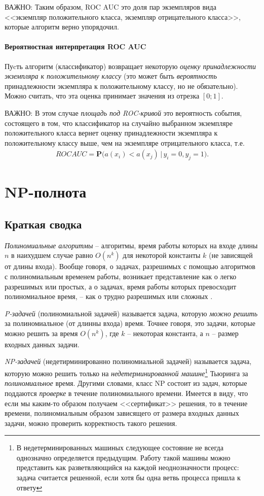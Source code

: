 \documentclass[%
	11pt,
	a4paper,
	utf8,
		]{article}
\begin{document}
ВАЖНО: Таким образом, ROC AUC это доля пар экземпляров вида <<экземпляр положительного класса, экземпляр отрицательного класса>>, которые алгоритм верно упорядочил.

\paragraph{Вероятностная интерпретация ROC AUC} Пуcть алгоритм (классификатор) возвращает некоторую \emph{оценку принадлежности экземпляра к положительному классу} (это может быть \emph{вероятность} принадлежности экземпляра к положительному классу, но не обязательно). Можно считать, что эта оценка принимает значения из отрезка $ [0;1] $.

ВАЖНО: В этом случае \emph{площадь под ROC-кривой} это вероятность события, состоящего в том, что классификатор на случайно выбранном экземпляре положительного класса вернет оценку принадлежности экземпляра к положительному классу выше, чем на экземпляре отрицательного класса, т.е.
\begin{align*}
	ROC AUC = \mathbf{P} \Big( a(x_i) < a(x_j) \, | \, y_i = 0, y_j = 1\Big).
\end{align*}


\section{NP-полнота}

\subsection{Краткая сводка}

\emph{Полиномиальные алгоритмы} -- алгоритмы, время работы которых на входе длины $ n $ в наихудшем случае равно $ O(n^k) $ для некоторой константы $ k $ (не зависящей от длины входа). Вообще говоря, о задачах, разрешимых с помощью алгоритмов с полиномиальным временем работы, возникает представление как о легко разрешимых или простых, а о задачах, время работы которых превосходит полиномиальное время, -- как о трудно разрешимых или сложных \cite[1096]{cormen-algo:2013}.

\emph{P-задачей} (полиномиальной задачей) называется задача, которую \emph{можно решить} за полиномиальное (от длинны входа) время. Точнее говоря, это задачи, которые можно решить за время $ O(n^k) $, где $ k $ -- некоторая константа, а $ n $ -- размер входных данных задачи.

\emph{NP-задачей} (недетирминированно полиномиальной задачей) называется задача, которую можно решить только на \emph{недетерминированной машине}\footnote{В недетерминированных машиных следующее состояние не всегда однозначно определяется предыдущим. Работу такой машины можно представить как разветвляющийся на каждой неоднозначности процесс: задача считается решенной, если хотя бы одна ветвь процесса пришла к ответу} Тьюринга за \emph{полиномиальное} время. Другими словами, класс NP состоит из задач, которые поддаются \emph{проверке} в течение полиномиального времени. Имеется в виду, что если мы каким-то образом получаем <<сертификат>> решения, то в течение времени, полиномиальным образом зависящего от размера входных данных задачи, можно проверить корректность такого решения.
\end{document}
